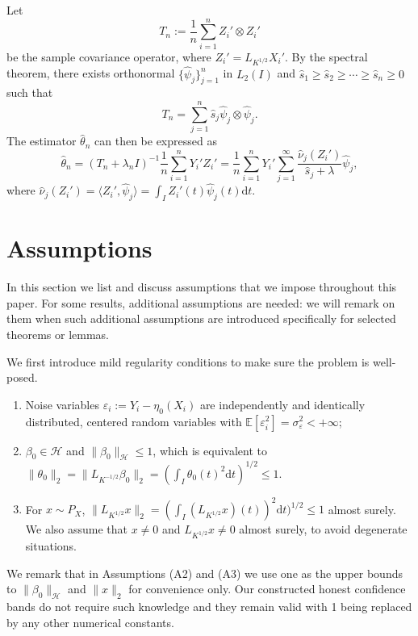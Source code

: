 \documentclass[11pt,a4paper]{article}
\renewcommand{\hat}{\widehat}
\theoremstyle{definition}
\theoremstyle{plain}
\theoremstyle{remark}
\newcommand{\ud}{\mathrm d}
\newcommand{\mH}{\mathcal H}
\begin{document}
Let
$$
T_n := \frac{1}{n}\sum_{i=1}^n Z_i'\otimes Z_i'
$$
be the sample covariance operator, where $Z_i'=L_{K^{1/2}}X_i'$. By the spectral theorem, there exists orthonormal $\{\hat\psi_j\}_{j=1}^n$ in $L_2(I)$ and $\hat s_1\geq \hat s_2\geq\cdots\geq \hat s_n\geq 0$ such that
$$
T_n = \sum_{j=1}^n \hat s_j\hat \psi_j\otimes\hat \psi_j.
$$
The estimator $\hat\theta_n$ can then be expressed as
\begin{equation}
\hat\theta_n = (T_n+\lambda_n I)^{-1}\frac{1}{n}\sum_{i=1}^n Y_i'Z_i' = \frac{1}{n}\sum_{i=1}^n Y_i'\sum_{j=1}^{\infty}\frac{\hat\nu_j(Z_i')}{\hat s_j+\lambda}\hat\psi_j,
\label{eq:krr-nointercept-fpca}
\end{equation}
where $\hat\nu_j(Z_i') = \langle Z_i', \hat\psi_j\rangle=\int_I Z_i'(t)\hat\psi_j(t)\ud t$.

\section{Assumptions}

In this section we list and discuss assumptions that we impose throughout this paper. For some results, additional assumptions are needed: 
we will remark on them when such additional assumptions are introduced specifically for selected theorems or lemmas.

We first introduce mild regularity conditions to make sure the problem is well-posed.
\begin{enumerate}
\item[(A1)] Noise variables $\varepsilon_i:=Y_i-\eta_0(X_i)$ are independently and identically distributed, centered random variables with $\mathbb E[\varepsilon_i^2]=\sigma_\varepsilon^2<+\infty$;
\item[(A2)] $\beta_0\in\mH$ and $\|\beta_0\|_\mH\leq 1$, which is equivalent to $\|\theta_0\|_2=\|L_{K^{-1/2}}\beta_0\|_2 =(\int_I \theta_0(t)^2\ud t)^{1/2} \leq 1$.
\item[(A3)] For $x\sim P_X$, $\|L_{K^{1/2}}x\|_2= (\int_I (L_{K^{1/2}}x)(t))^2\ud t)^{1/2}\leq 1$ almost surely. We also assume that $x\neq 0$ and $L_{K^{1/2}}x\neq 0$ almost surely, to avoid degenerate situations.
\end{enumerate}

We remark that in Assumptions (A2) and (A3) we use one as the upper bounds to $\|\beta_0\|_\mH$ and $\|x\|_2$ for convenience only. Our constructed honest confidence bands do not require such knowledge
and they remain valid with 1 being replaced by any other numerical constants.
\end{document}

